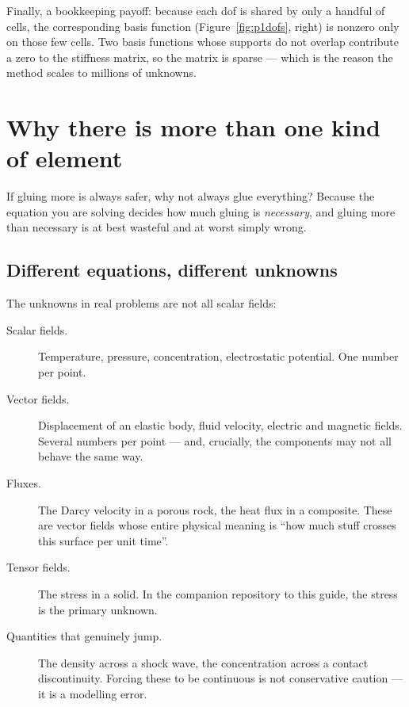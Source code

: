 \documentclass[11pt,a4paper]{article}
\begin{document}
Finally, a bookkeeping payoff: because each dof is shared by only a handful of
cells, the corresponding basis function (Figure~\ref{fig:p1dofs}, right) is
nonzero only on those few cells. Two basis functions whose supports do not
overlap contribute a zero to the stiffness matrix, so the matrix is sparse ---
which is the reason the method scales to millions of unknowns.

\FloatBarrier

\section{Why there is more than one kind of element}

If gluing more is always safer, why not always glue everything? Because the
equation you are solving decides how much gluing is \emph{necessary}, and
gluing more than necessary is at best wasteful and at worst simply wrong.

\subsection{Different equations, different unknowns}

The unknowns in real problems are not all scalar fields:

\begin{description}
\item[Scalar fields.] Temperature, pressure, concentration, electrostatic
  potential. One number per point.
\item[Vector fields.] Displacement of an elastic body, fluid velocity, electric
  and magnetic fields. Several numbers per point --- and, crucially, the
  components may not all behave the same way.
\item[Fluxes.] The Darcy velocity in a porous rock, the heat flux in a
  composite. These are vector fields whose entire physical meaning is ``how
  much stuff crosses this surface per unit time''.
\item[Tensor fields.] The stress in a solid. In the companion repository to
  this guide, the stress is the primary unknown.
\item[Quantities that genuinely jump.] The density across a shock wave, the
  concentration across a contact discontinuity. Forcing these to be continuous
  is not conservative caution --- it is a modelling error.
\end{description}
\end{document}
